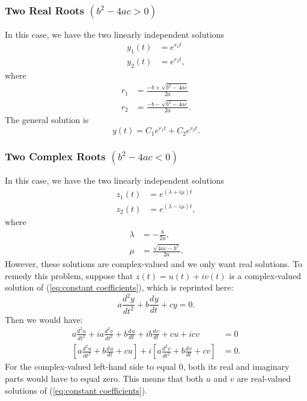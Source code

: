 \documentclass{myart}
\newcommand{\eq}[1]{(\ref{eq:#1})}
\newcommand{\deriv}[3][]{\frac{d^{#1}#2}{d#3^{#1}}}
\begin{document}
\subsubsection{Two Real Roots \texorpdfstring{$(b^2 - 4ac > 0)$}{(b^2 - 4ac > 0)}} \label{subsubsec:constant coefficients real roots}

In this case, we have the two linearly independent solutions
\begin{align*}
y_1(t) &= e^{r_1t} \\
y_2(t) &= e^{r_2t},
\end{align*}
where
\begin{align*}
r_1 &= \frac{-b + \sqrt{b^2 - 4ac}}{2a} \\
r_2 &= \frac{-b - \sqrt{b^2 - 4ac}}{2a}.
\end{align*}
The general solution is
\begin{equation*}
y(t) = C_1e^{r_1t} + C_2e^{r_2t}.
\end{equation*}

\subsubsection{Two Complex Roots \texorpdfstring{$(b^2 - 4ac < 0)$}{(b^2 - 4ac < 0)}} \label{subsubsec:constant coefficients complex roots}

In this case, we have the two linearly independent solutions
\begin{align*}
z_1(t) &= e^{(\lambda + i\mu)t} \\
z_2(t) &= e^{(\lambda - i\mu)t},
\end{align*}
where
\begin{align*}
\lambda &= -\frac{b}{2a}, \\
\mu &= \frac{\sqrt{4ac - b^2}}{2a}.
\end{align*}
However, these solutions are complex-valued and we only want real solutions. To remedy this problem, suppose that $z(t) = u(t) + iv(t)$ is a complex-valued solution of \eq{constant coefficients}, which is reprinted here:
\begin{equation*}
a \deriv[2]{y}{t} + b \deriv{y}{t} + cy = 0.
\end{equation*}
Then we would have:
\begin{align*}
a \deriv[2]{u}{t} + ia \deriv[2]{v}{t} + b \deriv{u}{t} + ib \deriv{v}{t} + cu + icv &= 0 \\
\left[a \deriv[2]{u}{t} + b \deriv{u}{t} + cu\right] + i\left[a \deriv[2]{v}{t} + b \deriv{v}{t} + cv\right] &= 0.
\end{align*}
For the complex-valued left-hand side to equal $0$, both its real and imaginary parts would have to equal zero. This means that both $u$ and $v$ are real-valued solutions of \eq{constant coefficients}.
\end{document}
